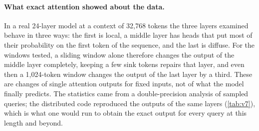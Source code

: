 \paragraph{What exact attention showed about the data.} In a real 24-layer model
at a context of 32{,}768 tokens the three layers examined behave in three ways:
the first is local, a middle layer has heads that put most of their probability on
the first token of the sequence, and the last is diffuse. For the windows tested, a
sliding window alone therefore changes the output of the middle layer completely,
keeping a few sink tokens repairs that layer, and even then a 1{,}024-token window
changes the output of the last layer by a third. These are changes of single
attention outputs for fixed inputs, not of what the model finally predicts. The
statistics came from a double-precision analysis of sampled queries; the
distributed code reproduced the outputs of the same layers (\cref{tab:v7}), which
is what one would run to obtain the exact output for every query at this length
and beyond.
